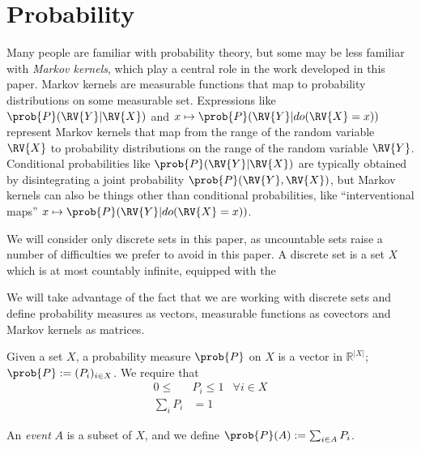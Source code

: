 

\section{Probability}

Many people are familiar with probability theory, but some may be less familiar with \emph{Markov kernels}, which play a central role in the work developed in this paper. Markov kernels are measurable functions that map to probability distributions on some measurable set. Expressions like $\prob{P}(\RV{Y}|\RV{X})$ and $x\mapsto \prob{P}(\RV{Y}|do(\RV{X}=x))$ represent Markov kernels that map from the range of the random variable $\RV{X}$ to probability distributions on the range of the random variable $\RV{Y}$. Conditional probabilities like $\prob{P}(\RV{Y}|\RV{X})$ are typically obtained by disintegrating a joint probability $\prob{P}(\RV{Y},\RV{X})$, but Markov kernels can also be things other than conditional probabilities, like ``interventional maps'' $x\mapsto \prob{P}(\RV{Y}|do(\RV{X}=x))$.

We will consider only discrete sets in this paper, as uncountable sets raise a number of difficulties we prefer to avoid in this paper. A discrete set is a set $X$ which is at most countably infinite, equipped with the 


We will take advantage of the fact that we are working with discrete sets and define probability measures as vectors, measurable functions as covectors and Markov kernels as matrices.

Given a set $X$, a probability measure $\prob{P}$ on $X$ is a vector in $\mathbb{R}^{|X|}$; $\prob{P}:=(P_i)_{i\in X}$. We require that
\begin{align}
	0\leq &P_i \leq 1 &\forall i\in X\\
	\sum_i P_i &= 1 
\end{align}

An \emph{event} $A$ is a subset of $X$, and we define $\prob{P}(A):=\sum_{i\in A} P_i$.

